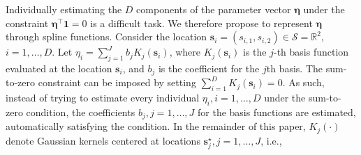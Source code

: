 \documentclass[lineno]{biometrika}
\begin{document}
Individually estimating the $D$ components of the parameter vector $\bm \eta$ under the constraint $\bm \eta^\top \bm 1=0$ is a difficult task. We therefore propose to represent $\bm \eta$ through spline functions. Consider the location $\bm s_i = (s_{i,1}, s_{i,2}) \in \mathcal{S}=\mathbb{R}^2$, $i=1, \ldots, D$. Let $\eta_i = \sum_{j=1}^J b_{j}K_j(\bm s_i)$, where $K_j(\bm s_i)$ is the $j$-th basis function evaluated at the location $\bm s_i$, and $b_j$ is the coefficient for the $j$th basis. The sum-to-zero constraint can be imposed by setting $\sum_{i=1}^D K_j(\bm s_i)=0$. As such, instead of trying to estimate every individual $\eta_i,i=1,\dots,D$ under the sum-to-zero condition, the coefficients $b_j,j=1,\dots,J$ for the basis functions are estimated, automatically satisfying the condition.
%
In the remainder of this paper, $K_j(\cdot)$ denote Gaussian kernels centered at locations $\bm s_j^\star, j=1,\dots,J$, i.e.,
\end{document}
